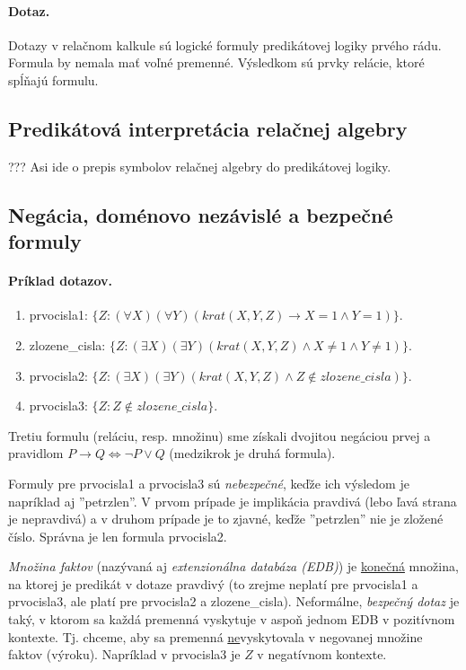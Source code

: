 \documentclass[10pt,a4paper]{article}
\begin{document}
\paragraph{Dotaz.}
Dotazy v relačnom kalkule sú logické formuly predikátovej logiky prvého rádu.
Formula by nemala mať voľné premenné. Výsledkom sú prvky relácie, ktoré spĺňajú formulu. 

\subsection{Predikátová interpretácia relačnej algebry}
??? Asi ide o prepis symbolov relačnej algebry do predikátovej logiky. 

\subsection{Negácia, doménovo nezávislé a bezpečné formuly}

\paragraph{Príklad dotazov.}
\begin{enumerate}
\item prvocisla1: $\{Z : (\forall X) (\forall Y) (krat(X,Y,Z) \rightarrow X = 1 \wedge Y = 1)\}$.
\item zlozene\_cisla: $\{Z : (\exists X) (\exists Y) (krat(X,Y,Z) \wedge X \neq 1 \wedge Y \neq 1)\}$.
\item prvocisla2: $\{Z : (\exists X) (\exists Y) (krat(X,Y,Z) \wedge Z \notin zlozene\_cisla) \}$.
\item prvocisla3: $\{Z : Z \notin zlozene\_cisla\}$.
\end{enumerate}
Tretiu formulu (reláciu, resp. množinu) sme získali dvojitou negáciou prvej a pravidlom $P \rightarrow Q \Leftrightarrow \neg P \vee Q$ (medzikrok je druhá formula). 

Formuly pre prvocisla1 a prvocisla3 sú \emph{nebezpečné}, keďže ich výsledom je napríklad aj ''petrzlen''.
V prvom prípade je implikácia pravdivá (lebo ľavá strana je nepravdivá) a v druhom prípade je to zjavné, keďže ''petrzlen'' nie je zložené číslo. 
Správna je len formula prvocisla2. 

\emph{Množina faktov} (nazývaná aj \emph{extenzionálna databáza (EDB)}) je \underline{konečná} množina, na ktorej je predikát v dotaze pravdivý (to zrejme neplatí pre prvocisla1 a prvocisla3, ale platí pre prvocisla2 a zlozene\_cisla).
Neformálne, \emph{bezpečný dotaz} je taký, v ktorom sa každá premenná vyskytuje v aspoň jednom EDB v pozitívnom kontexte. Tj. chceme, aby sa premenná \underline{ne}vyskytovala v negovanej množine faktov (výroku). Napríklad v prvocisla3 je $Z$ v negatívnom kontexte.  
\end{document}
